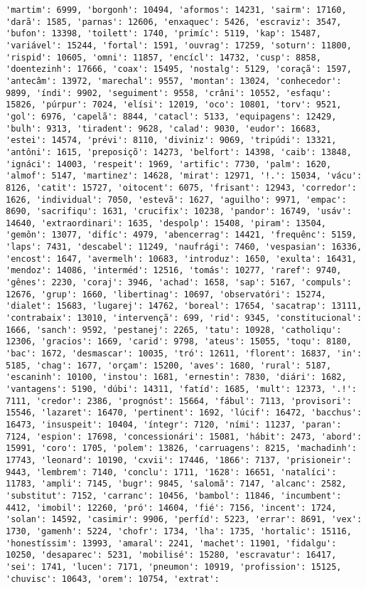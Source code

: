 \documentclass[11pt]{article}
\begin{document}
\begin{Verbatim}[commandchars=\\\{\}]
'martim': 6999, 'borgonh': 10494, 'aformos': 14231, 'sairm': 17160, 'darã': 1585, 'parnas': 12606, 'enxaquec': 5426, 'escraviz': 3547, 'bufon': 13398, 'toilett': 1740, 'primíc': 5119, 'kap': 15487, 'variável': 15244, 'fortal': 1591, 'ouvrag': 17259, 'soturn': 11800, 'rispid': 10605, 'omni': 11857, 'encícl': 14732, 'cusp': 8858, 'doentezinh': 17666, 'coax': 15495, 'nostalg': 5129, 'coraçã': 1597, 'antecâm': 13972, 'marechal': 9557, 'montan': 13024, 'conhecedor': 9899, 'índi': 9902, 'seguiment': 9558, 'crâni': 10552, 'esfaqu': 15826, 'púrpur': 7024, 'elísi': 12019, 'oco': 10801, 'torv': 9521, 'gol': 6976, 'capelã': 8844, 'catacl': 5133, 'equipagens': 12429, 'bulh': 9313, 'tiradent': 9628, 'calad': 9030, 'eudor': 16683, 'estei': 14574, 'prévi': 8110, 'diviniz': 9069, 'tripúdi': 13321, 'antôni': 1615, 'preposiçõ': 14273, 'belfort': 14398, 'caib': 13848, 'ignáci': 14003, 'respeit': 1969, 'artific': 7730, 'palm': 1620, 'almof': 5147, 'martinez': 14628, 'mirat': 12971, '!.': 15034, 'vácu': 8126, 'catit': 15727, 'oitocent': 6075, 'frisant': 12943, 'corredor': 1626, 'individual': 7050, 'estevã': 1627, 'aguilho': 9971, 'empac': 8690, 'sacrifiqu': 1631, 'crucifix': 10238, 'pandor': 16749, 'usáv': 14640, 'extraordinari': 1635, 'despolp': 15408, 'piram': 13504, 'gemôn': 13077, 'difíc': 4979, 'abencerrag': 14421, 'frequênc': 5159, 'laps': 7431, 'descabel': 11249, 'naufrági': 7460, 'vespasian': 16336, 'encost': 1647, 'avermelh': 10683, 'introduz': 1650, 'exulta': 16431, 'mendoz': 14086, 'interméd': 12516, 'tomás': 10277, 'raref': 9740, 'gênes': 2230, 'coraj': 3946, 'achad': 1658, 'sap': 5167, 'compuls': 12676, 'grup': 1660, 'libertinag': 10697, 'observatóri': 15274, 'dialet': 15683, 'lugarej': 14762, 'boreal': 17654, 'sacatrap': 13111, 'contrabaix': 13010, 'intervençã': 699, 'rid': 9345, 'constitucional': 1666, 'sanch': 9592, 'pestanej': 2265, 'tatu': 10928, 'catholiqu': 12306, 'gracios': 1669, 'carid': 9798, 'ateus': 15055, 'toqu': 8180, 'bac': 1672, 'desmascar': 10035, 'tró': 12611, 'florent': 16837, 'in': 5185, 'chag': 1677, 'orçam': 15200, 'aves': 1680, 'rural': 5187, 'escaninh': 10100, 'instou': 1681, 'ernestin': 7830, 'diári': 1682, 'vantagens': 5190, 'dúbi': 14311, 'fatíd': 1685, 'mult': 12373, '.!': 7111, 'credor': 2386, 'prognóst': 15664, 'fábul': 7113, 'provisori': 15546, 'lazaret': 16470, 'pertinent': 1692, 'lúcif': 16472, 'bacchus': 16473, 'insuspeit': 10404, 'íntegr': 7120, 'ními': 11237, 'paran': 7124, 'espion': 17698, 'concessionári': 15081, 'hábit': 2473, 'abord': 15991, 'coro': 1705, 'polem': 13826, 'carruagens': 8215, 'machadinh': 17743, 'leonard': 10190, 'cxvii': 17446, '1866': 7137, 'prisioneir': 9443, 'lembrem': 7140, 'conclu': 1711, '1628': 16651, 'natalíci': 11783, 'ampli': 7145, 'bugr': 9845, 'salomã': 7147, 'alcanc': 2582, 'substitut': 7152, 'carranc': 10456, 'bambol': 11846, 'incumbent': 4412, 'imobil': 12260, 'pró': 14604, 'fié': 7156, 'incent': 1724, 'solan': 14592, 'casimir': 9906, 'perfíd': 5223, 'errar': 8691, 'vex': 1730, 'gamenh': 5224, 'chofr': 1734, 'lha': 1735, 'hortalic': 15116, 'honestíssim': 13993, 'amaral': 2241, 'machet': 11901, 'fidalgu': 10250, 'desaparec': 5231, 'mobilisé': 15280, 'escravatur': 16417, 'sei': 1741, 'lucen': 7171, 'pneumon': 10919, 'profission': 15125, 'chuvisc': 10643, 'orem': 10754, 'extrat': 
\end{Verbatim}
\end{document}
